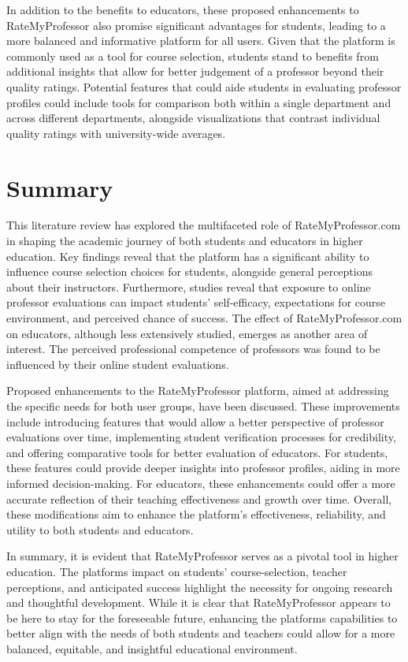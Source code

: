 \documentclass[twocolumn, doc,12pt]{apa7}
\begin{document}
In addition to the benefits to educators, these proposed enhancements to RateMyProfessor also promise significant advantages for students, leading to a more balanced and informative platform for all users. Given that the platform is commonly used as a tool for course selection, students stand to benefits from additional insights that allow for better judgement of a professor beyond their quality ratings. Potential features that could aide students in evaluating professor profiles could include tools for comparison both within a single department and across different departments, alongside visualizations that contrast individual quality ratings with university-wide averages.

\section{Summary}
This literature review has explored the multifaceted role of RateMyProfessor.com in shaping the academic journey of both students and educators in higher education. Key findings reveal that the platform has a significant ability to influence course selection choices for students, alongside general perceptions about their instructors. Furthermore, studies reveal that exposure to online professor evaluations can impact students' self-efficacy, expectations for course environment, and perceived chance of success. The effect of RateMyProfessor.com on educators, although less extensively studied, emerges as another area of interest.  The perceived professional competence of professors was found to be influenced by their online student evaluations.

Proposed enhancements to the RateMyProfessor platform, aimed at addressing the specific needs for both user groups, have been discussed. These improvements include introducing features that would allow a better perspective of professor evaluations over time, implementing student verification processes for credibility, and offering comparative tools for better evaluation of educators. For students, these features could provide deeper insights into professor profiles, aiding in more informed decision-making. For educators, these enhancements could offer a more accurate reflection of their teaching effectiveness and growth over time. Overall, these modifications aim to enhance the platform's effectiveness, reliability, and utility to both students and educators.

In summary, it is evident that RateMyProfessor serves as a pivotal tool in higher education. The platforms impact on students' course-selection, teacher perceptions, and anticipated success highlight the necessity for ongoing research and thoughtful development. While it is clear that RateMyProfessor appears to be here to stay for the foreseeable future, enhancing the platforms capabilities to better align with the needs of both students and teachers could allow for a more balanced, equitable, and insightful educational environment.

\printbibliography
\end{document}
